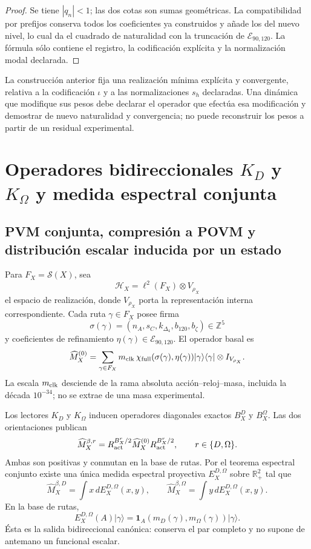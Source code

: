 \begin{proof}
Se tiene \(|q_n|<1\); las dos cotas son sumas geométricas. La compatibilidad
por prefijos conserva todos los coeficientes ya construidos y añade los del
nuevo nivel, lo cual da el cuadrado de naturalidad con la truncación de
\(\mathcal E_{90,120}\). La fórmula sólo contiene el registro, la codificación
explícita y la normalización modal declarada.
\end{proof}

La construcción anterior fija una realización mínima explícita y convergente,
relativa a la codificación \(\iota\) y a las normalizaciones \(s_h\) declaradas.
Una dinámica que modifique sus pesos debe declarar el operador que efectúa esa
modificación y demostrar de nuevo naturalidad y convergencia; no puede
reconstruir los pesos a partir de un residual experimental.

\section{Operadores bidireccionales \texorpdfstring{\(K_D\) y \(K_\Omega\)}{K_D y K_Omega} y medida espectral conjunta}

\subsection{PVM conjunta, compresión a POVM y distribución escalar inducida por un estado}

Para \(F_X=\mathscr S(X)\), sea
\[
 \mathcal H_X=\ell^2(F_X)\otimes V_{\rho_X}
\]
el espacio de realización, donde \(V_{\rho_X}\) porta la representación
interna correspondiente. Cada ruta \(\gamma\in F_X\) posee firma
\[
 \sigma(\gamma)
 =(n_A,s_C,k_{\Delta_4},b_{120},b_\zeta)\in\mathbb Z^5
\]
y coeficientes de refinamiento
\(\eta(\gamma)\in\mathcal E_{90,120}\). El operador basal es
\[
 \widehat M_X^{(0)}
 =\sum_{\gamma\in F_X}
 m_{\rm clk}\,
 \chi_{\rm full}(\sigma(\gamma),\eta(\gamma))
 |\gamma\rangle\langle\gamma|\otimes I_{V_{\rho_X}}.
\]
La escala \(m_{\rm clk}\) desciende de la rama absoluta
acción--reloj--masa, incluida la década \(10^{-34}\); no se extrae de una
masa experimental.

Los lectores \(K_D\) y \(K_\Omega\) inducen operadores diagonales exactos
\(B_X^D\) y \(B_X^\Omega\). Las dos orientaciones publican
\[
 \widehat M_X^{\beta,r}
 =R_{\rm act}^{B_X^r/2}\widehat M_X^{(0)}
  R_{\rm act}^{B_X^r/2},
 \qquad r\in\{D,\Omega\}.
\]
Ambas son positivas y conmutan en la base de rutas. Por el teorema espectral
conjunto existe una única medida espectral proyectiva
\(E_X^{D,\Omega}\) sobre \(\mathbb R_+^2\) tal que
\[
 \widehat M_X^{\beta,D}
 =\int x\,dE_X^{D,\Omega}(x,y),
 \qquad
 \widehat M_X^{\beta,\Omega}
 =\int y\,dE_X^{D,\Omega}(x,y).
\]
En la base de rutas,
\[
 E_X^{D,\Omega}(A)|\gamma\rangle
 =\mathbf 1_A\!\left(m_D(\gamma),m_\Omega(\gamma)\right)
  |\gamma\rangle.
\]
Ésta es la salida bidireccional canónica: conserva el par completo y no
supone de antemano un funcional escalar.

